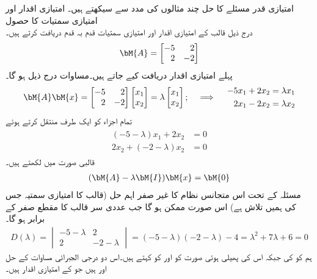امتیازی قدر مسئلے کا حل چند مثالوں کی مدد سے سیکھتے ہیں۔
\quad امتیازی اقدار اور امتیازی سمتیات کا حصول\\
درج ذیل قالب کے امتیازی اقدار اور امتیازی سمتیات قدم بہ قدم دریافت کرتے ہیں۔
\begin{align*}
\bM{A}=\begin{bmatrix*}[r] -5&2\\2&-2 \end{bmatrix*}
\end{align*}
پہلے امتیازی اقدار دریافت کیے جاتے ہیں۔مساوات  درج ذیل ہو گا۔
\begin{gather*}
\bM{A}\bM{x}=\begin{bmatrix*}[r] -5&2\\2&-2 \end{bmatrix*}\begin{bmatrix} x_1\\x_2 \end{bmatrix}=\lambda \begin{bmatrix} x_1\\x_2 \end{bmatrix};\quad \implies \quad \begin{aligned}-5x_1+2x_2&=\lambda x_1\\ 2x_1-2x_2&=\lambda x_2\end{aligned}
\end{gather*}
تمام اجزاء کو ایک طرف منتقل کرتے ہوئے
\begin{gather}
\begin{aligned}\label{مساوات_امتیازی_مثال_الف}
(-5-\lambda)x_1+2x_2&=0\\
2x_2+(-2-\lambda)x_2&=0
\end{aligned}
\end{gather}
قالبی صورت میں لکھتے ہیں۔
\begin{align*}
(\bM{A}-\lambda \bM{I})\bM{x}=\bM{0}
\end{align*}
مسئلہ  کے تحت اس متجانس نظام کا غیر صفر اہم حل  (قالب  کا امتیازی سمتیہ جس کی ہمیں تلاش ہے)  اس صورت ممکن ہو گا جب عددی سر قالب کا مقطع صفر کے برابر ہو گا۔
\begin{align*}
D(\lambda)=\begin{vmatrix} -5-\lambda& 2\\ 2 & -2-\lambda \end{vmatrix}=(-5-\lambda)(-2-\lambda)-4=\lambda^2+7\lambda+6=0
\end{align*}
ہم  کو  کی  جبکہ اس کی پھیلی  ہوئی صورت کو  اور  کو  کہتے ہیں۔اس دو درجی الجبرائی مساوات کے حل  اور  ہیں جو  کے امتیازی اقدار ہیں۔

